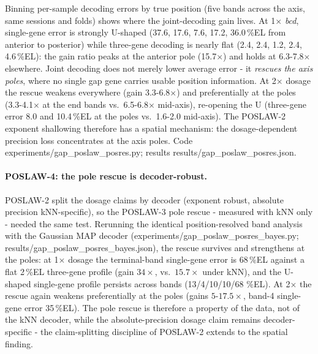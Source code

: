 Binning per-sample decoding errors by true position (five bands across the
axis, same sessions and folds) shows where the joint-decoding gain lives. At
1$\times$ \emph{bcd}, single-gene error is strongly U-shaped (37.6, 17.6, 7.6,
17.2, 36.0\,\%EL from anterior to posterior) while three-gene decoding is
nearly flat (2.4, 2.4, 1.2, 2.4, 4.6\,\%EL): the gain ratio peaks at the
anterior pole (15.7$\times$) and holds at 6.3-7.8$\times$ elsewhere. Joint
decoding does not merely lower average error - it \emph{rescues the axis
poles}, where no single gap gene carries usable position information. At
2$\times$ dosage the rescue weakens everywhere (gain 3.3-6.8$\times$) and
preferentially at the poles (3.3-4.1$\times$ at the end bands vs.\
6.5-6.8$\times$ mid-axis), re-opening the U (three-gene error 8.0 and
10.4\,\%EL at the poles vs.\ 1.6-2.0 mid-axis). The POSLAW-2 exponent
shallowing therefore has a spatial mechanism: the dosage-dependent precision
loss concentrates at the axis poles. Code experiments/gap\_poslaw\_posres.py;
results results/gap\_poslaw\_posres.json.

\paragraph{POSLAW-4: the pole rescue is decoder-robust.}
POSLAW-2 split the dosage claims by decoder (exponent robust, absolute
precision kNN-specific), so the POSLAW-3 pole rescue - measured with kNN only -
needed the same test. Rerunning the identical position-resolved band analysis
with the Gaussian MAP decoder (experiments/gap\_poslaw\_posres\_bayes.py;
results/gap\_poslaw\_posres\_bayes.json), the rescue survives and
strengthens at the poles: at 1$\times$ dosage the terminal-band single-gene
error is 68\,\%EL against a flat 2\,\%EL three-gene profile (gain
$34\times$, vs.\ $15.7\times$ under kNN), and the U-shaped single-gene
profile persists across bands (13/4/10/10/68 \%EL). At 2$\times$ the rescue
again weakens preferentially at the poles (gains $5$-$17.5\times$,
band-4 single-gene error 35\,\%EL). The pole rescue is therefore a property
of the data, not of the kNN decoder, while the absolute-precision dosage claim
remains decoder-specific - the claim-splitting discipline of POSLAW-2 extends
to the spatial finding.
